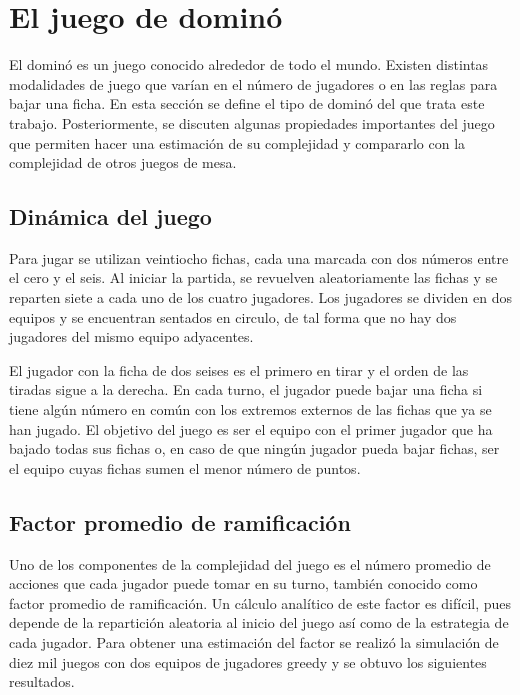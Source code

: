 \chapter{El juego de dominó}

\noindent

El dominó es un juego conocido alrededor de todo el mundo. Existen distintas
modalidades de juego que varían en el número de jugadores o en las reglas para
bajar una ficha. En esta sección se define el tipo de dominó del que trata este
trabajo. Posteriormente, se discuten algunas propiedades importantes del juego
que permiten hacer una estimación de su complejidad y compararlo con la
complejidad de otros juegos de mesa.


\section{Dinámica del juego}

Para jugar se utilizan veintiocho fichas, cada una marcada con dos números entre
el cero y el seis. Al iniciar la partida, se revuelven aleatoriamente las fichas
y se reparten siete a cada uno de los cuatro jugadores. Los jugadores se dividen
en dos equipos y se encuentran sentados en circulo, de tal forma que no hay dos
jugadores del mismo equipo adyacentes.

El jugador con la ficha de dos seises es el primero en tirar y el orden de las
tiradas sigue a la derecha. En cada turno, el jugador puede bajar una ficha si
tiene algún número en común con los extremos externos de las fichas que ya se
han jugado. El objetivo del juego es ser el equipo con el primer jugador que ha
bajado todas sus fichas o, en caso de que ningún jugador pueda bajar fichas, ser
el equipo cuyas fichas sumen el menor número de puntos.

\section{Factor promedio de ramificación}

Uno de los componentes de la complejidad del juego es el número promedio de
acciones que cada jugador puede tomar en su turno, también conocido como factor
promedio de ramificación. Un cálculo analítico de este factor es difícil, pues
depende de la repartición aleatoria al inicio del juego así como de la
estrategia de cada jugador. Para obtener una estimación del factor se realizó la
simulación de diez mil juegos con dos equipos de jugadores greedy y se obtuvo
los siguientes resultados.

